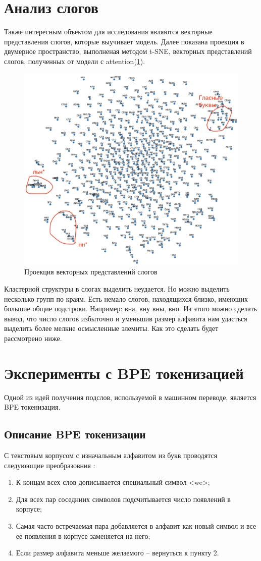 \documentclass[14pt, a4paper, russian]{extreport}
\begin{document}
\section{Анализ слогов}

Также интересным объектом для исследования являются векторные представления слогов, которые выучивает модель. Далее показана проекция в двумерное пространство, выполненая методом t-SNE, векторных представлений слогов, полученных от модели с attention(\cref{fig:tsne}).

\begin{figure}[H]
	\begin{center}
		\includegraphics[width=0.5\linewidth]{Emb}
	\end{center}
	\caption{\small{Проекция векторных представлений слогов}}
	\label{fig:tsne}
\end{figure}

Кластерной структуры в слогах выделить неудается. Но можно выделить несколько групп по краям. Есть немало слогов, находящихся близко, имеющих большие общие подстроки. Например: вна, вну вны, вно. Из этого можно сделать вывод, что число слогов избыточно и уменьшив размер алфавита нам удасться выделить более мелкие осмысленные элемнты. Как это сделать будет рассмотрено ниже.

\section{Эксперименты с BPE токенизацией}
Одной из идей получения подслов, используемой в машинном переводе, является BPE токенизация. 
\subsection{Описание BPE токенизации}
С текстовым корпусом с изначальным алфавитом из букв проводятся следуюющие преобразовния \cite{sennrich}:
\begin{enumerate}[  1{)} ]
	\item К концам всех слов дописывается специальный символ <we>;
	\item Для всех пар соседниих символов подсчитывается число появлений в корпусе;
	\item Самая часто встречаемая пара добавляется в алфавит как новый символ и все ее появления в корпусе заменяется на него;
	\item Если размер алфавита меньше желаемого --  вернуться к пункту 2.
\end{enumerate}
\end{document}
